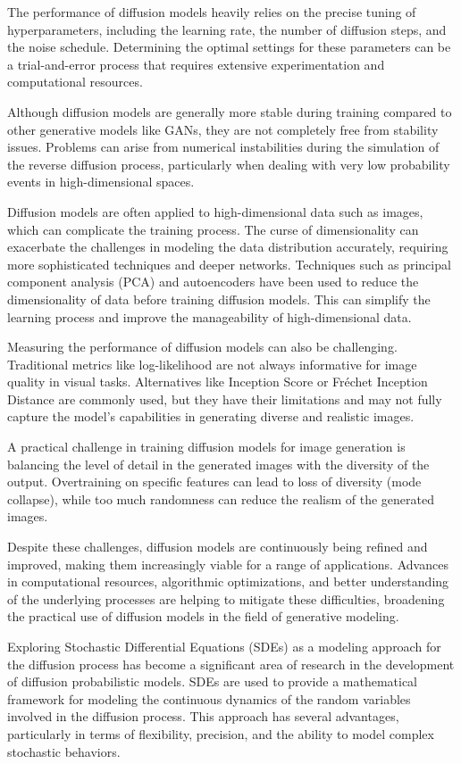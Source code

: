 The performance of diffusion models heavily relies on the precise tuning of hyperparameters,
including the learning rate, the number of diffusion steps, and the noise schedule. Determining the
optimal settings for these parameters can be a trial-and-error process that requires extensive
experimentation and computational resources.

Although diffusion models are generally more stable during training compared to other generative
models like GANs, they are not completely free from stability issues. Problems can arise from
numerical instabilities during the simulation of the reverse diffusion process, particularly when
dealing with very low probability events in high-dimensional spaces.

Diffusion models are often applied to high-dimensional data such as images, which can complicate the
training process. The curse of dimensionality can exacerbate the challenges in modeling the data
distribution accurately, requiring more sophisticated techniques and deeper networks. Techniques
such as principal component analysis (PCA) and autoencoders have been used to reduce the
dimensionality of data before training diffusion models. This can simplify the learning process and
improve the manageability of high-dimensional data.

Measuring the performance of diffusion models can also be challenging. Traditional metrics like
log-likelihood are not always informative for image quality in visual tasks. Alternatives like
Inception Score or Fr\'echet Inception Distance are commonly used, but they have their limitations
and may not fully capture the model’s capabilities in generating diverse and realistic images.

A practical challenge in training diffusion models for image generation is balancing the level of
detail in the generated images with the diversity of the output. Overtraining on specific features
can lead to loss of diversity (mode collapse), while too much randomness can reduce the realism of
the generated images.

Despite these challenges, diffusion models are continuously being refined and improved, making them
increasingly viable for a range of applications. Advances in computational resources, algorithmic
optimizations, and better understanding of the underlying processes are helping to mitigate these
difficulties, broadening the practical use of diffusion models in the field of generative modeling.

Exploring Stochastic Differential Equations (SDEs) as a modeling approach for the diffusion process
has become a significant area of research in the development of diffusion probabilistic models. SDEs
are used to provide a mathematical framework for modeling the continuous dynamics of the random
variables involved in the diffusion process. This approach has several advantages, particularly in
terms of flexibility, precision, and the ability to model complex stochastic behaviors.

